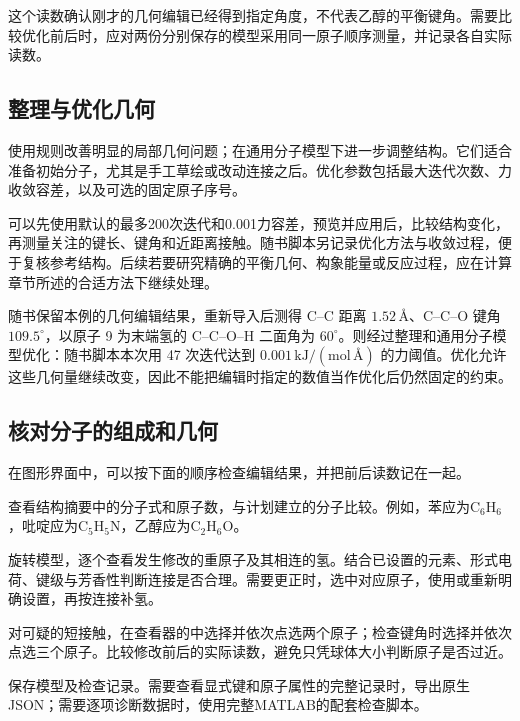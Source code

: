 这个读数确认刚才的几何编辑已经得到指定角度，不代表乙醇的平衡键角。需要比较优化前后时，应对两份分别保存的模型采用同一原子顺序测量，并记录各自实际读数。



\subsection{整理与优化几何}

使用规则改善明显的局部几何问题；在通用分子模型下进一步调整结构。它们适合准备初始分子，尤其是手工草绘或改动连接之后。优化参数包括最大迭代次数、力收敛容差，以及可选的固定原子序号。

可以先使用默认的最多200次迭代和0.001力容差，预览并应用后，比较结构变化，再测量关注的键长、键角和近距离接触。随书脚本另记录优化方法与收敛过程，便于复核参考结构。后续若要研究精确的平衡几何、构象能量或反应过程，应在计算章节所述的合适方法下继续处理。

随书保留本例的几何编辑结果，重新导入后测得 C--C 距离 $1.52\,\text{\AA}$、C--C--O 键角 $109.5^\circ$，以原子 9 为末端氢的 C--C--O--H 二面角为 $60^\circ$。\mbox{}则经过整理和通用分子模型优化：随书脚本本次用 47 次迭代达到 $0.001\,\mathrm{kJ/(mol\,\text{\AA})}$ 的力阈值。优化允许这些几何量继续改变，因此不能把编辑时指定的数值当作优化后仍然固定的约束。

\subsection{核对分子的组成和几何}\label{sec:molecule-manual-check}

在图形界面中，可以按下面的顺序检查编辑结果，并把前后读数记在一起。

\begin{steps}
  \item 查看结构摘要中的分子式和原子数，与计划建立的分子比较。例如，苯应为$\mathrm{C_6H_6}$，吡啶应为$\mathrm{C_5H_5N}$，乙醇应为$\mathrm{C_2H_6O}$。
  \item 旋转模型，逐个查看发生修改的重原子及其相连的氢。结合已设置的元素、形式电荷、键级与芳香性判断连接是否合理。需要更正时，选中对应原子，使用或重新明确设置，再按连接补氢。
  \item 对可疑的短接触，在查看器的中选择并依次点选两个原子；检查键角时选择并依次点选三个原子。比较修改前后的实际读数，避免只凭球体大小判断原子是否过近。
  \item 保存模型及检查记录。需要查看显式键和原子属性的完整记录时，导出原生JSON；需要逐项诊断数据时，使用完整MATLAB\regmark{}的配套检查脚本。
\end{steps}

